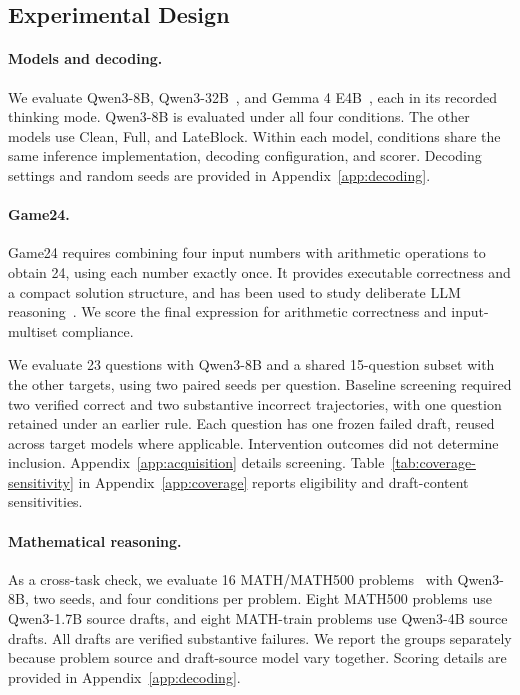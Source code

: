 \documentclass{article}
\newcommand{\fullaccess}{\ifmmode\mathrm{Full}\else\textup{Full}\fi}
\newcommand{\lateblock}{\ifmmode\mathrm{LateBlock}\else\textup{LateBlock}\fi}
\newcommand{\clean}{\ifmmode\mathrm{Clean}\else\textup{Clean}\fi}
\begin{document}
\subsection{Experimental Design}
\label{sec:experiments}

\paragraph{Models and decoding.}

We evaluate Qwen3-8B, Qwen3-32B~\citep{qwen2025qwen3}, and Gemma 4 E4B~\citep{google2026gemma4}, each in its recorded thinking mode. Qwen3-8B is evaluated under all four conditions. The other models use \clean{}, \fullaccess{}, and \lateblock{}. Within each model, conditions share the same inference implementation, decoding configuration, and scorer. Decoding settings and random seeds are provided in Appendix~\ref{app:decoding}.

\paragraph{Game24.}

Game24 requires combining four input numbers with arithmetic operations to obtain 24, using each number exactly once. It provides executable correctness and a compact solution structure, and has been used to study deliberate LLM reasoning~\citep{yao2023tree}. We score the final expression for arithmetic correctness and input-multiset compliance.

We evaluate 23 questions with Qwen3-8B and a shared 15-question subset with the other targets, using two paired seeds per question. Baseline screening required two verified correct and two substantive incorrect trajectories, with one question retained under an earlier rule. Each question has one frozen failed draft, reused across target models where applicable. Intervention outcomes did not determine inclusion. Appendix~\ref{app:acquisition} details screening. Table~\ref{tab:coverage-sensitivity} in Appendix~\ref{app:coverage} reports eligibility and draft-content sensitivities.

\paragraph{Mathematical reasoning.}

As a cross-task check, we evaluate 16 MATH/MATH500 problems~\citep{hendrycks2021math} with Qwen3-8B, two seeds, and four conditions per problem. Eight MATH500 problems use Qwen3-1.7B source drafts, and eight MATH-train problems use Qwen3-4B source drafts. All drafts are verified substantive failures. We report the groups separately because problem source and draft-source model vary together. Scoring details are provided in Appendix~\ref{app:decoding}.
\end{document}
